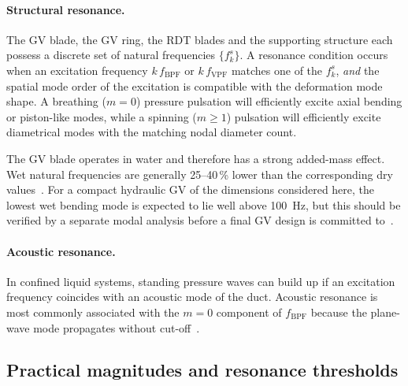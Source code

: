 \paragraph{Structural resonance.} The GV blade, the GV
ring, the RDT blades and the supporting structure each possess
a discrete set of natural frequencies $\{f_k^s\}$. A resonance
condition occurs when an excitation frequency $k\,f_{\mathrm{BPF}}$
or $k\,f_{\mathrm{VPF}}$ matches one of the $f_k^s$, \emph{and} the
spatial mode order of the excitation is compatible with the
deformation mode shape. A breathing ($m=0$) pressure pulsation will
efficiently excite axial bending or piston-like modes, while a
spinning ($m\geq 1$) pulsation will efficiently excite diametrical
modes with the matching nodal diameter count.
 
The GV blade operates in water and therefore has a strong
added-mass effect. Wet natural frequencies are generally 25--40\,\%
lower than the corresponding dry values~\cite{Tanaka2011}. For a
compact hydraulic GV of the dimensions considered here, the
lowest wet bending mode is expected to lie well above 100~Hz, but
this should be verified by a separate modal analysis before a final
GV design is committed to~\cite{Valentin2015}.
 
\paragraph{Acoustic resonance.} In confined liquid systems, standing
pressure waves can build up if an excitation frequency coincides with
an acoustic mode of the duct. Acoustic resonance is most commonly
associated with the $m=0$ component of $f_{\mathrm{BPF}}$ because
the plane-wave mode propagates without cut-off~\cite{Nicolet2007}.
 
\subsection{Practical magnitudes and resonance thresholds}
\label{sec:rsi-magnitudes}
 
